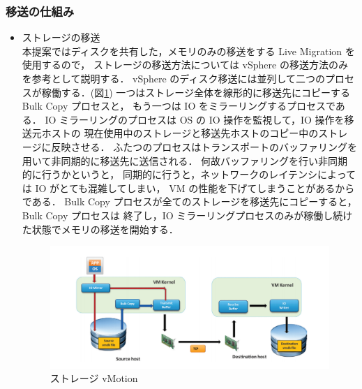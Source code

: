 \documentclass[graduation-thesis]{mlarticle}
\begin{document}
\subsubsection{移送の仕組み}
\label{sec-2-3-4}
\begin{itemize}
\item ストレージの移送\\
      本提案ではディスクを共有した，メモリのみの移送をする Live Migration を使用するので，
ストレージの移送方法については vSphere の移送方法のみを参考として説明する．
vSphere のディスク移送には並列して二つのプロセスが稼働する．(図\ref{vmotion})
一つはストレージ全体を線形的に移送先にコピーする Bulk Copy プロセスと，
もう一つは IO をミラーリングするプロセスである．
IO ミラーリングのプロセスは OS の IO 操作を監視して，IO 操作を移送元ホストの
現在使用中のストレージと移送先ホストのコピー中のストレージに反映させる．
ふたつのプロセスはトランスポートのバッファリングを用いて非同期的に移送先に送信される．
何故バッファリングを行い非同期的に行うかというと，
同期的に行うと，ネットワークのレイテンシによっては IO がとても混雑してしまい，
VM の性能を下げてしまうことがあるからである．
Bulk Copy プロセスが全てのストレージを移送先にコピーすると，Bulk Copy プロセスは
終了し，IO ミラーリングプロセスのみが稼働し続けた状態でメモリの移送を開始する．
\begin{figure}[H]\begin{center}\includegraphics[width=16.0cm]{./img/vmotion.png}\caption{ ストレージ vMotion}\label{vmotion}\end{center}\end{figure}


\end{itemize}
\end{document}
